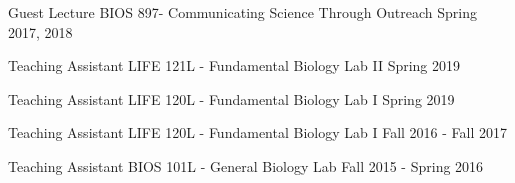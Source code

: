

\begin{cvoutreaches}

  \cvoutreach
    {Guest Lecture}
    {BIOS 897- Communicating Science Through Outreach}
    {Spring 2017, 2018}

  \cvoutreach
    {Teaching Assistant}
    {LIFE 121L - Fundamental Biology Lab II}
    {Spring 2019}
    
  \cvoutreach
    {Teaching Assistant}
    {LIFE 120L - Fundamental Biology Lab I}
    {Spring 2019}
  
  \cvoutreach
   {Teaching Assistant}
    {LIFE 120L - Fundamental Biology Lab I}
    {Fall 2016 - Fall 2017}
    
  \cvoutreach
    {Teaching Assistant}
    {BIOS 101L - General Biology Lab}
    {Fall 2015 - Spring 2016}
\end{cvoutreaches}
